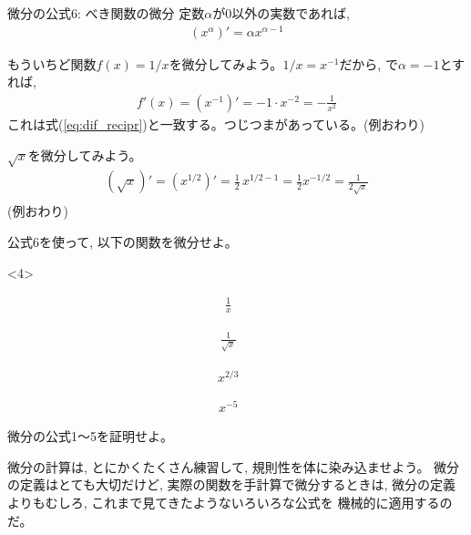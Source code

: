 \begin{itembox}{微分の公式6: べき関数の微分}
定数$\alpha$が0以外の実数であれば, 
\begin{eqnarray}
(x^{\alpha})'=\alpha x^{\alpha-1}\label{eq:diff_form6}
\end{eqnarray}
\end{itembox}

\begin{exmpl} もういちど関数$f(x)=1/x$を微分してみよう。$1/x=x^{-1}$だから, 
で$\alpha=-1$とすれば, 
\begin{eqnarray}
f'(x)=(x^{-1})'=-1\cdot x^{-2}=-\frac{1}{x^2}
\end{eqnarray}
これは式(\ref{eq:dif_recipr})と一致する。つじつまがあっている。(例おわり)\end{exmpl}

\begin{exmpl} $\sqrt{x}$を微分してみよう。
\begin{eqnarray}
(\sqrt{x})'=(x^{1/2})'=\frac{1}{2}\,x^{1/2-1}=\frac{1}{2}x^{-1/2}=\frac{1}{2\sqrt{x}}\nonumber\\
\end{eqnarray}
(例おわり)\end{exmpl}

\begin{q}\label{q:diff_pow} 公式6を使って, 以下の関数を微分せよ。
\begin{edaenumerate}<4>
\item \begin{eqnarray*}\frac{1}{x}\,\,\,\,\,\,\,\,\end{eqnarray*}
\item \begin{eqnarray*}\frac{1}{\sqrt{x}}\,\,\,\,\,\,\,\,\end{eqnarray*}
\item \begin{eqnarray*}x^{2/3}\,\,\,\,\,\,\,\,\end{eqnarray*}
\item \begin{eqnarray*}x^{-5}\,\,\,\,\,\,\,\,\end{eqnarray*}
\end{edaenumerate}\end{q}
\mv

\begin{q}\label{q:diff_theories1_5} 微分の公式1〜5を証明せよ。\end{q}
\mv

微分の計算は, とにかくたくさん練習して, 規則性を体に染み込ませよう。
微分の定義はとても大切だけど, 実際の関数を手計算で微分するときは, 
微分の定義よりもむしろ, これまで見てきたようないろいろな公式を
機械的に適用するのだ。\hv

